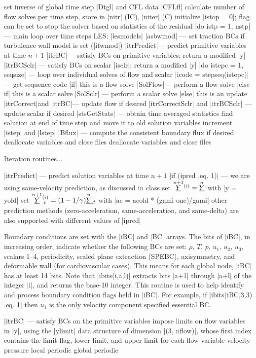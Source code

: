 \documentclass[11pt]{article}
\begin{document}
\begin{outline}[deep]
			\4 set inverse of global time step |Dtgl| and CFL data |CFLfl|
		\3 calculate number of flow solves per time step, store in |nitr| (IC), |niter| (C)
		\3 initialize |istop = 0|; flag can be set to stop the solver based on statistics of the residual
		\3 |do istp = 1, nstp| --- main loop over time steps
			\4 LES: |lesmodels|
			\4 |asbwmod| --- set traction BCs if turbulence wall model is set (|itwmod|)
			\4 |itrPredict|\ra --- predict primitive variables at time $n+1$
			\4 |itrBC|\ra --- satisfy BCs on primitive variables; return a modified |y|
			\4 |itrBCSclr| --- satisfy BCs on scalar |isclr|; return a modified |y|
			\4 |do istepc = 1, seqsize| --- loop over individual solves of flow and scalar
				\5 |icode = stepseq(istepc)| --- get sequence code
				\5 |if| this is a flow solve
					\6 |SolFlow|\ra --- perform a flow solve
				\5 |else if| this is a scalar solve
					\6 |SolSclr| --- perform a scalar solve
				\5 |else| this is an update
					\6 |itrCorrect|\ra and |itrBC|\ra --- update flow if desired
					\6 |itrCorrectSclr| and |itrBCSclr| --- update scalar if desired
			\4 |stsGetStats| --- obtain time averaged statistics
			\4 find solution at end of time step and move it to old solution variables
			\4 increment |istep| and |lstep|
			\4 |Bflux| --- compute the consistent boundary flux if desired
		\3 deallocate variables and close files
	\2 deallocate variables and close files
\end{outline}

Iteration routines...

\begin{outline}[deep]
\1 |itrPredict| --- predict solution variables at time $n+1$
	\2 |if (ipred .eq. 1)| --- we are using same-velocity prediction, as discussed in class
		\3 set $\oset{n+1}{\ul{Y}}^{(i)} = \oset{n}{\ul{Y}}$ with |y = yold|
		\3 set $\oset{n+1}{\ul{Y}}^{(i)}_{,t} = (1-1/\gamma) \oset{n}{\ul{Y}}_{,t}$ with |ac = acold * (gami-one)/gami|
	\2 other prediction methods (zero-acceleration, same-acceleration, and same-delta) are also supported with different values of |ipred|
\end{outline}

Boundary conditions are set with the |iBC| and |BC| arrays. The bits of |iBC|, in increasing order, indicate whether the following BCs are set: $\rho$, $T$, $p$, $u_1$, $u_2$, $u_3$, scalars 1--4, periodicity, scaled plane extraction (SPEBC), axisymmetry, and deformable wall (for cardiovascular cases). This means for each global node, |iBC| has at least 14 bits. Note that |ibits(i,a,l)| extracts bits |a+1| through |a+l| of the integer |i|, and returns the base-10 integer. This routine is used to help identify and process boundary condition flags held in |iBC|. For example, if |ibits(iBC,3,3) .eq. 1| then $u_1$ is the only velocity component specified essential BC.
\begin{outline}[deep]
\1 |itrBC| --- satisfy BCs on the primitive variables
	\2 impose limits on flow variables in |y|, using the |ylimit| data structure of dimension |(3, nflow)|, whose first index contains the limit flag, lower limit, and upper limit for each flow variable
	\2 velocity
	\2 pressure
	\2 local periodic
	\2 global periodic
\end{outline}
\end{document}
